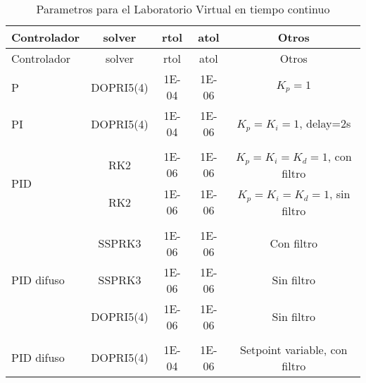         {\setlength\LTleft{0pt}
        \setlength\LTright{0pt}
        \centering
        \footnotesize
        \renewcommand{\arraystretch}{0.89}
        \begin{longtable}{l @{\extracolsep{\fill}} cccc}
        \caption[Parametros para el Laboratorio Virtual en tiempo continuo]{Parametros para el Laboratorio Virtual en tiempo continuo} 
        \label{tab:parametrosLVc} \\
        \toprule
        Controlador  & solver & rtol & atol & Otros       \\ \midrule
        \endfirsthead
        \toprule
        Controlador  & solver & rtol & atol & Otros       \\ \midrule
        \endhead
        \bottomrule
        \endfoot
         P                           & DOPRI5(4)    & \num{1E-04} & \num{1E-06} & $K_p=1$                                   \\
         PI                          & DOPRI5(4)    & \num{1E-04} & \num{1E-06} & $K_p=K_i=1$, delay=2s                     \\
                                     &              &             &             &                                           \\[-3pt] 
         \multirow{2}{*}{PID}        & RK2          & \num{1E-06} & \num{1E-06} & $K_p=K_i=K_d=1$, con filtro               \\
                                     & RK2          & \num{1E-06} & \num{1E-06} & $K_p=K_i=K_d=1$, sin filtro               \\
                                     &              &             &             &                                           \\[-3pt]  
         \multirow{3}{*}{PID difuso} & SSPRK3       & \num{1E-06} & \num{1E-06} & Con filtro                                \\
                                     & SSPRK3       & \num{1E-06} & \num{1E-06} & Sin filtro                                \\
                                     & DOPRI5(4)    & \num{1E-06} & \num{1E-06} & Sin filtro                                \\
                                     &              &             &             &                                           \\[-3pt]  
         PID difuso                  & DOPRI5(4)    & \num{1E-04} & \num{1E-06} & Setpoint variable, con filtro             \\

\end{longtable}}

